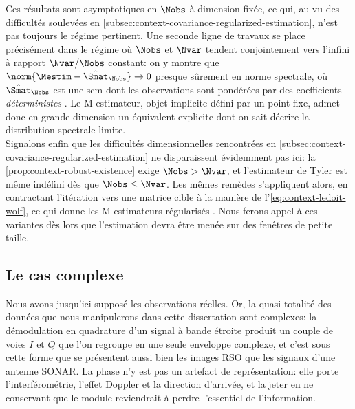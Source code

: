 Ces résultats sont asymptotiques en $\Nobs$ à dimension fixée, ce qui, au vu des difficultés soulevées en \cref{subsec:context-covariance-regularized-estimation}, n'est pas toujours le régime pertinent. Une seconde ligne de travaux se place précisément dans le régime où $\Nobs$ et $\Nvar$ tendent conjointement vers l'infini à rapport $\Nvar/\Nobs$ constant: on y montre que $\norm{\Mestim - \hat{\Smat}_\Nobs}\to 0$ presque sûrement en norme spectrale, où $\hat{\Smat}_\Nobs$ est une scm dont les observations sont pondérées par des coefficients \emph{déterministes} . Le M-estimateur, objet implicite défini par un point fixe, admet donc en grande dimension un équivalent explicite dont on sait décrire la distribution spectrale limite. \\

Signalons enfin que les difficultés dimensionnelles rencontrées en \cref{subsec:context-covariance-regularized-estimation} ne disparaissent évidemment pas ici: la \cref{prop:context-robust-existence} exige $\Nobs>\Nvar$, et l'estimateur de Tyler est même indéfini dès que $\Nobs\leq\Nvar$. Les mêmes remèdes s'appliquent alors, en contractant l'itération vers une matrice cible à la manière de l'\cref{eq:context-ledoit-wolf}, ce qui donne les M-estimateurs régularisés . Nous ferons appel à ces variantes dès lors que l'estimation devra être menée sur des fenêtres de petite taille.

\subsection{Le cas complexe}
\label{subsec:context-definition-complex}

Nous avons jusqu'ici supposé les observations réelles. Or, la quasi-totalité des données que nous manipulerons dans cette dissertation sont complexes: la démodulation en quadrature d'un signal à bande étroite produit un couple de voies $I$ et $Q$ que l'on regroupe en une seule enveloppe complexe, et c'est sous cette forme que se présentent aussi bien les images RSO que les signaux d'une antenne SONAR. La phase n'y est pas un artefact de représentation: elle porte l'interférométrie, l'effet Doppler et la direction d'arrivée, et la jeter en ne conservant que le module reviendrait à perdre l'essentiel de l'information.

